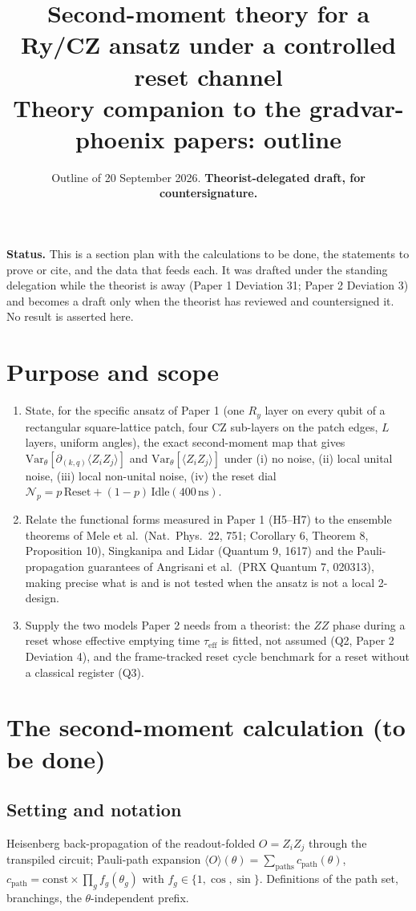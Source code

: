 \documentclass[11pt,a4paper]{article}
\title{Second-moment theory for a Ry/CZ ansatz under a controlled reset channel\\[1ex]\large Theory companion to the gradvar-phoenix papers: outline}
\author{\tbd{college theorist} \and \tbd{programme authors}}
\date{Outline of 20 September 2026. \textbf{Theorist-delegated draft, for countersignature.}}
\newcommand{\Var}{\mathrm{Var}}
\newcommand{\Np}{\mathcal{N}_p}
\begin{document}
\maketitle

\noindent\textbf{Status.} This is a section plan with the calculations to be done, the statements to prove or cite, and the data that feeds each. It was drafted under the standing delegation while the theorist is away (Paper 1 Deviation 31; Paper 2 Deviation 3) and becomes a draft only when the theorist has reviewed and countersigned it. No result is asserted here.

\section{Purpose and scope}
\begin{enumerate}
\item State, for the specific ansatz of Paper 1 (one $R_y$ layer on every qubit of a rectangular square-lattice patch, four CZ sub-layers on the patch edges, $L$ layers, uniform angles), the exact second-moment map that gives $\Var_\theta[\partial_{(k,q)}\langle Z_iZ_j\rangle]$ and $\Var_\theta[\langle Z_iZ_j\rangle]$ under (i) no noise, (ii) local unital noise, (iii) local non-unital noise, (iv) the reset dial $\Np = p\,\mathrm{Reset} + (1-p)\,\mathrm{Idle}(400\,\mathrm{ns})$.
\item Relate the functional forms measured in Paper 1 (H5--H7) to the ensemble theorems of Mele et al.\ (Nat.\ Phys.\ 22, 751; Corollary 6, Theorem 8, Proposition 10), Singkanipa and Lidar (Quantum 9, 1617) and the Pauli-propagation guarantees of Angrisani et al.\ (PRX Quantum 7, 020313), making precise what is and is not tested when the ansatz is not a local 2-design.
\item Supply the two models Paper 2 needs from a theorist: the $ZZ$ phase during a reset whose effective emptying time $\tau_{\mathrm{eff}}$ is fitted, not assumed (Q2, Paper 2 Deviation 4), and the frame-tracked reset cycle benchmark for a reset without a classical register (Q3).
\end{enumerate}

\section{The second-moment calculation (to be done)}
\subsection{Setting and notation}
Heisenberg back-propagation of the readout-folded $O = Z_iZ_j$ through the transpiled circuit; Pauli-path expansion $\langle O\rangle(\theta) = \sum_{\text{paths}} c_{\text{path}}(\theta)$, $c_{\text{path}} = \text{const}\times\prod_g f_g(\theta_g)$ with $f_g \in \{1, \cos, \sin\}$. Definitions of the path set, branchings, the $\theta$-independent prefix.
\end{document}
